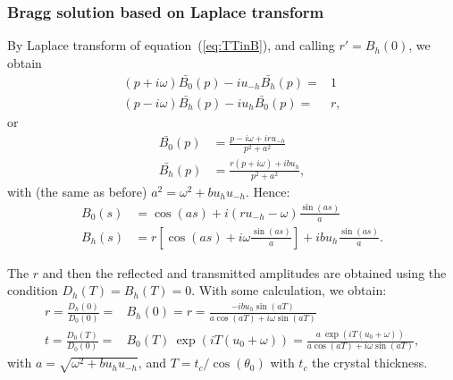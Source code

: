 \documentclass{iucr}
\newcommand{\inblue}[1]{{\color{blue}#1}}
\begin{document}
\subsubsection{Bragg solution based on Laplace transform}By Laplace transform of equation~(\ref{eq:TTinB}), and calling $r'=B_h(0)$, we obtain
\begin{subequations}
\label{eq:TTbraggLaplace}
\begin{align}
(p + i \omega) \bar{B_0}(p) - i u_{-h} \bar{B_h}(p)= & 1 \nonumber \\
(p - i \omega) \bar{B_h}(p) - i u_{h} \bar{B_0}(p)= & r, \nonumber
\end{align}
\end{subequations}
or 
\begin{subequations}
\begin{align}
\bar{B_0}(p) &= \frac{p - i \omega + i r u_{-h}}{p^2 + a^2} \nonumber \\
\bar{B_h}(p) &= \frac{r (p + i \omega) + i b u_h}{p^2 + a^2}, \nonumber
\end{align}
\end{subequations}
with (the same as before) $a^2=\omega^2+b u_h u_{-h}$. Hence:
\begin{subequations}
\begin{align}
B_0(s) &= \cos(a s) + i (r u_{-h} - \omega) \frac{\sin(a s)}{a} \nonumber \\
B_h(s) &= r [\cos(a s) + i \omega \frac{\sin(a s)}{a}] + i b u_h \frac{\sin(a s)}{a}. \nonumber
\end{align}
\end{subequations}

The \inblue{$r$} and then the reflected and transmitted amplitudes are obtained using the condition $D_h(T)=B_h(T)=0$. With some calculation, we obtain: 
\begin{subequations}
\begin{align}
r=\frac{D_h(0)}{D_0(0)} =& B_h(0) = r = \frac{-i b u_h \sin(a T)}{a \cos(a T) + i\omega \sin(a T)} \nonumber \\
t =\frac{D_0(T)}{D_0(0)}= & B_0(T) ~ \exp(i T (u_0+\omega)) = \frac{a~\exp(i T (u_0+\omega))}{a \cos(a T) + i\omega \sin(a T)} , \nonumber
\end{align}
\end{subequations}
with $a=\sqrt{\omega^2 + b u_h u_{-h}}$, and  
$T=t_c/\cos(\theta_0)$ with $t_c$ the crystal thickness.

\end{document}
